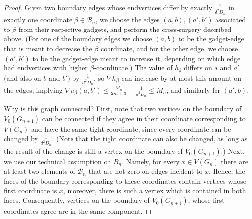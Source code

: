 \documentclass[10pt]{article}
\theoremstyle{plain}
\theoremstyle{remark}
\newcommand{\1}{\mathbbm{1}}
\numberwithin{equation}{section}
\begin{document}
\begin{proof}
Given two boundary edges whose endvertices differ by exactly $\frac{1}{d^2D_n}$ in exactly one coordinate $\beta \in \mathcal{B}_n$, we choose the edges $(a,b), (a',b')$ associated to $\beta$ from their respective gadgets, and perform the cross-surgery described above. (For one of the boundary edges we choose $(a,b)$ to be the gadget-edge that is meant to decrease the $\beta$ coordinate, and for the other edge, we choose $(a',b')$ to be the gadget-edge meant to increase it, depending on which edge had endvertices with higher $\beta$-coordinate.) The value of $h_{\beta}$ differs on $a$ and $a'$ (and also on $b$ and $b'$) by $\frac{1}{d^2D_n}$, so $\nabla h_{\beta}$ can increase by at most this amount on the edges, implying $\nabla h_{\beta} (a,b') \leq \frac{M_n}{2m+3} + \frac{1}{d^2D_n} \leq M_n$, and similarly for $(a',b)$.

Why is this graph connected? First, note that two vertices on the boundary of $V_0(G_{n+1})$ can be connected if they agree in their coordinate corresponding to $V(G_n)$ and have the same tight coordinate, since every coordinate can be changed by $\frac{1}{d^2D_n}$. (Note that the tight coordinate can also be changed, as long as the result of the change is still a vertex on the boundary of $V_0(G_{n+1})$.) Next, we use our technical assumption on $B_n$. Namely, for every $x \in V(G_n)$ there are at least two elements of $\mathcal{B}_n$ that are not zero on edges incident to $x$. Hence, the faces of the boundary corresponding to these coordinates contain vertices whose first coordinate is $x$, moreover, there is such a vertex which is contained in both faces. Consequently, vertices on the boundary of $V_0(G_{n+1})$, whose first coordinates agree are in the same component. 


\end{proof}
\end{document}
